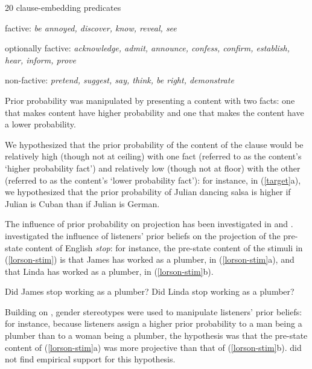 \documentclass[11pt,fleqn]{article}
\newcommand{\6}{\mbox{$[\hspace*{-.6mm}[$}}
\newcommand{\9}{\mbox{$]\hspace*{-.6mm}]$}}
\begin{document}
\begin{exe}
\ex\label{pred} 20 clause-embedding predicates 

\begin{xlist}

\ex factive: {\em be annoyed, discover, know, reveal, see}

\ex optionally factive: {\em acknowledge, admit, announce, confess, confirm, establish, hear, inform, prove}

\ex non-factive:  {\em pretend, suggest, say, think, be right, demonstrate}

\end{xlist}

\end{exe}

Prior probability was manipulated by presenting a content with two facts: one that makes content have higher probability and one that makes the content have a lower probability.

We hypothesized that the prior probability of the content of the clause would be relatively high (though not at ceiling) with one fact (referred to as the content's `higher probability fact') and relatively low (though not at floor) with the other (referred to as the content's `lower probability fact'): for instance, in (\ref{target}a), we hypothesized that the prior probability of Julian dancing salsa is higher if Julian is Cuban than if Julian is German.

\newpage

The influence of prior probability on projection has been investigated in \citealt{lorson2018} and \citealt{mahler2020}. \citet{lorson2018} investigated the influence of listeners' prior beliefs on the projection of the pre-state content of English {\em stop}: for instance, the pre-state content of the stimuli in (\ref{lorson-stim}) is that James has worked as a plumber, in (\ref{lorson-stim}a), and that Linda has worked as a plumber, in (\ref{lorson-stim}b). 

\begin{exe}
\ex\label{lorson-stim} 
\begin{xlist}
\ex Did James stop working as a plumber?
\ex Did Linda stop working as a plumber?
\end{xlist}
\end{exe}
Building on \citealt{boyce-etal2018}, gender stereotypes were used to manipulate listeners' prior beliefs: for instance, because listeners assign a higher prior probability to a man being a plumber than to a woman being a plumber, the hypothesis was that the pre-state content of (\ref{lorson-stim}a) was more projective than that of (\ref{lorson-stim}b). \citet{lorson2018} did not find empirical support for this hypothesis.
\end{document}
